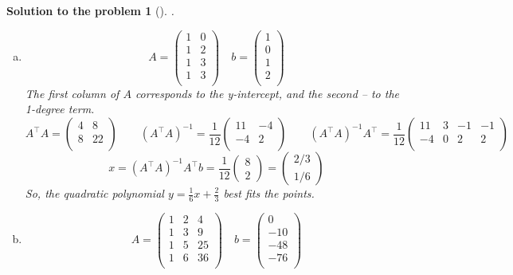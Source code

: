 \documentclass[12pt,a4]{article}
\newtheorem{solution}{Solution to the problem}
\begin{document}
\begin{solution}[]\rm .
\begin{enumerate}[(a)]
\item
\[
A = 
\begin{pmatrix}
1 & 0\\
1 & 2\\
1 & 3\\
1 & 3\\
\end{pmatrix} \quad
b = 
\begin{pmatrix}
1\\ 0\\ 1\\ 2\\
\end{pmatrix}
\]
The first column of $A$ corresponds to the y-intercept, and the second -- to the 1-degree term.
\[
A^\top A = 
\begin{pmatrix}
 4 &  8 \\
 8 &  22 \\
\end{pmatrix} \qquad
(A^\top A)^{-1} = \frac{1}{12}
\begin{pmatrix}
 11 &  -4 \\
 -4 &   2 \\
\end{pmatrix} \qquad
(A^\top A)^{-1} A^\top =  \frac{1}{12}
\begin{pmatrix}
11 &  3 & -1 & -1 \\
-4 &  0 &  2 &  2 \\
\end{pmatrix}
\]
\[
x = (A^\top A)^{-1} A^\top b
= \frac{1}{12}
\begin{pmatrix} 
8 \\ 2
\end{pmatrix}
=
\begin{pmatrix} 
2/3 \\ 1/6
\end{pmatrix}
\]
So, the quadratic polynomial $y = \frac{1}{6}x + \frac{2}{3}$ best fits the points.
\item
\[
A = 
\begin{pmatrix}
1 & 2 & 4\\
1 & 3 & 9\\
1 & 5 & 25\\
1 & 6 & 36\\
\end{pmatrix} \quad
b = 
\begin{pmatrix}
0\\ -10\\ -48\\ -76\\

\end{pmatrix}\]
\end{enumerate}
\end{solution}
\end{document}
